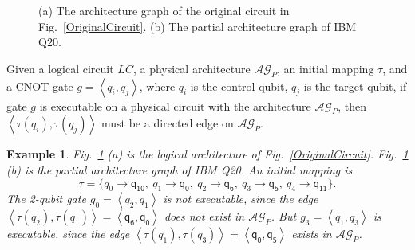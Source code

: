 \documentclass[journal]{IEEEtran}
\newtheorem{example}{Example}
\begin{document}
\begin{figure}
\begin{center}
{
			}
\end{center}
	
	\caption{(a) The architecture graph of the original circuit in Fig.~\ref{OriginalCircuit}. (b) The partial architecture graph of IBM Q20.}
	\label{LAGPAG}
\end{figure}
	

Given a logical circuit $LC$, a physical architecture $\mathcal{AG}_{P}$, an initial mapping $\tau$, and a CNOT gate $g=\left \langle \textit{q}_\textit{i},\textit{q}_\textit{j}\right \rangle $, where $\textit{q}_\textit{i}$ is the control qubit, $\textit{q}_\textit{j}$ is the target qubit,
if gate $g$ is executable on a physical circuit with the architecture $\mathcal{AG}_{P}$, then
$\left \langle\tau(\textit{q}_\textit{i}),\tau(\textit{q}_\textit{j})\right \rangle $ 
must be a directed edge on $\mathcal{AG}_{P}$.


\begin{example}
	Fig.~\ref{LAGPAG} (a) is the logical architecture of Fig.~\ref{OriginalCircuit}. 
	Fig.~\ref{LAGPAG} (b) is the partial architecture graph of IBM Q20. An initial mapping is 
	$$\tau=\{\textit{q}_\textit{0}\rightarrow  \textsf{q}_{\textsf{10}},\ \textit{q}_\textit{1}\rightarrow \textsf{q}_{\textsf{0}},\ 
	\textit{q}_\textit{2}\rightarrow  \textsf{q}_{\textsf{6}},\ \textit{q}_\textit{3}\rightarrow  \textsf{q}_{\textsf{5}},\ \textit{q}_\textit{4}\rightarrow  \textsf{q}_{\textsf{11}}\} .$$
The 2-qubit gate	$g_{0}=\left \langle \textit{q}_\textit{2},\textit{q}_\textit{1}\right \rangle $ is not executable, since the edge $\left \langle \tau(\textit{q}_\textit{2}),\tau(\textit{q}_\textit{1})\right \rangle =\left \langle \textsf{q}_{\textsf{6}},\textsf{q}_{\textsf{0}}\right \rangle $ does not exist in $\mathcal{AG}_{P}$.
	But $g_{3}=\left \langle \textit{q}_\textit{1},\textit{q}_\textit{3}\right \rangle $ is executable, since 
	the edge $\left \langle \tau(\textit{q}_\textit{1}),\tau(\textit{q}_\textit{3})\right \rangle =\left \langle \textsf{q}_{\textsf{0}},\textsf{q}_{\textsf{5}}\right \rangle $  exists in $\mathcal{AG}_{P}$.
\end{example}
\end{document}
